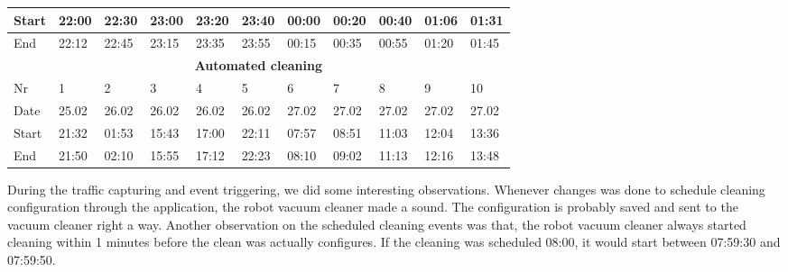 \begin{table}[H]
\begin{tabular}{|lllllllllll|}
\multicolumn{1}{|l|}{Start}  & \multicolumn{1}{l|}{22:00} & \multicolumn{1}{l|}{22:30} & \multicolumn{1}{l|}{23:00} & \multicolumn{1}{l|}{23:20} & \multicolumn{1}{l|}{23:40} & \multicolumn{1}{l|}{00:00} & \multicolumn{1}{l|}{00:20} & \multicolumn{1}{l|}{00:40} & \multicolumn{1}{l|}{01:06} & 01:31 \\ \hline
\multicolumn{1}{|l|}{End}    & \multicolumn{1}{l|}{22:12} & \multicolumn{1}{l|}{22:45} & \multicolumn{1}{l|}{23:15} & \multicolumn{1}{l|}{23:35} & \multicolumn{1}{l|}{23:55} & \multicolumn{1}{l|}{00:15} & \multicolumn{1}{l|}{00:35} & \multicolumn{1}{l|}{00:55} & \multicolumn{1}{l|}{01:20} & 01:45 \\ \hline
\multicolumn{11}{|c|}{\textbf{Automated cleaning}}                                                                                                                                                                                                                                                        \\ \hline
\multicolumn{1}{|l|}{Nr} & \multicolumn{1}{l|}{1}     & \multicolumn{1}{l|}{2}     & \multicolumn{1}{l|}{3}     & \multicolumn{1}{l|}{4}     & \multicolumn{1}{l|}{5}     & \multicolumn{1}{l|}{6}     & \multicolumn{1}{l|}{7}     & \multicolumn{1}{l|}{8}     & \multicolumn{1}{l|}{9}     & 10    \\ \hline
\multicolumn{1}{|l|}{Date}   & \multicolumn{1}{l|}{25.02} & \multicolumn{1}{l|}{26.02} & \multicolumn{1}{l|}{26.02} & \multicolumn{1}{l|}{26.02} & \multicolumn{1}{l|}{26.02} & \multicolumn{1}{l|}{27.02} & \multicolumn{1}{l|}{27.02} & \multicolumn{1}{l|}{27.02} & \multicolumn{1}{l|}{27.02} & 27.02 \\ \hline
\multicolumn{1}{|l|}{Start}  & \multicolumn{1}{l|}{21:32} & \multicolumn{1}{l|}{01:53} & \multicolumn{1}{l|}{15:43} & \multicolumn{1}{l|}{17:00} & \multicolumn{1}{l|}{22:11} & \multicolumn{1}{l|}{07:57} & \multicolumn{1}{l|}{08:51} & \multicolumn{1}{l|}{11:03} & \multicolumn{1}{l|}{12:04} & 13:36 \\ \hline
\multicolumn{1}{|l|}{End}    & \multicolumn{1}{l|}{21:50} & \multicolumn{1}{l|}{02:10} & \multicolumn{1}{l|}{15:55} & \multicolumn{1}{l|}{17:12} & \multicolumn{1}{l|}{22:23} & \multicolumn{1}{l|}{08:10} & \multicolumn{1}{l|}{09:02} & \multicolumn{1}{l|}{11:13} & \multicolumn{1}{l|}{12:16} & 13:48 \\ \hline
\end{tabular}
\end{table}

During the traffic capturing and event triggering, we did some interesting observations. Whenever changes was done to schedule cleaning configuration through the application, the robot vacuum cleaner made a sound. The configuration is probably saved and sent to the vacuum cleaner right a way. Another observation on the scheduled cleaning events was that, the robot vacuum cleaner always started cleaning within 1 minutes before the clean was actually configures. If the cleaning was scheduled 08:00, it would start between 07:59:30 and 07:59:50.

